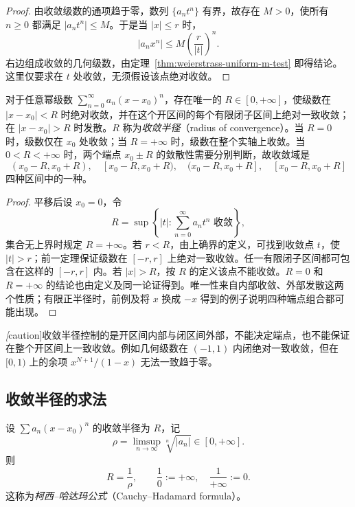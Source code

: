 \documentclass[UTF8,12pt,a4paper,fontset=fandol]{ctexbook}
\begin{document}
\begin{proof}
由收敛级数的通项趋于零，数列 $\{a_nt^n\}$ 有界，故存在 $M>0$，使所有 $n\geq0$ 都满足 $|a_nt^n|\leq M$。于是当 $|x|\leq r$ 时，
\[
    |a_nx^n|\leq M\left(\frac r{|t|}\right)^n.
\]
右边组成收敛的几何级数，由定理~\ref{thm:weierstrass-uniform-m-test} 即得结论。这里仅要求在 $t$ 处收敛，无须假设该点绝对收敛。
\end{proof}

\begin{theorem}[收敛半径与收敛域]
\label{thm:power-series-radius-and-domain}
对于任意幂级数 $\sum_{n=0}^\infty a_n(x-x_0)^n$，存在唯一的 $R\in[0,+\infty]$，使级数在 $|x-x_0|<R$ 时绝对收敛，并在这个开区间的每个有限闭子区间上绝对一致收敛；在 $|x-x_0|>R$ 时发散。$R$ 称为\emph{收敛半径}（radius of convergence）。当 $R=0$ 时，级数仅在 $x_0$ 处收敛；当 $R=+\infty$ 时，级数在整个实轴上收敛。当 $0<R<+\infty$ 时，两个端点 $x_0\pm R$ 的敛散性需要分别判断，故收敛域是
\[
    (x_0-R,x_0+R),\quad [x_0-R,x_0+R),\quad
    (x_0-R,x_0+R],\quad [x_0-R,x_0+R]
\]
四种区间中的一种。
\end{theorem}

\begin{proof}
平移后设 $x_0=0$，令
\[
    R=\sup\left\{|t|:\sum_{n=0}^\infty a_nt^n\text{ 收敛}\right\},
\]
集合无上界时规定 $R=+\infty$。若 $r<R$，由上确界的定义，可找到收敛点 $t$，使 $|t|>r$；前一定理保证级数在 $[-r,r]$ 上绝对一致收敛。任一有限闭子区间都可包含在这样的 $[-r,r]$ 内。若 $|x|>R$，按 $R$ 的定义该点不能收敛。$R=0$ 和 $R=+\infty$ 的结论也由定义及同一论证得到。唯一性来自内部收敛、外部发散这两个性质；有限正半径时，前例及将 $x$ 换成 $-x$ 得到的例子说明四种端点组合都可能出现。
\end{proof}

\emph[caution]{收敛半径控制的是开区间内部与闭区间外部，不能决定端点，也不能保证在整个开区间上一致收敛。}例如几何级数在 $(-1,1)$ 内闭绝对一致收敛，但在 $[0,1)$ 上的余项 $x^{N+1}/(1-x)$ 无法一致趋于零。

\subsection{收敛半径的求法}
\label{subsec:computing-the-radius-of-convergence}

\begin{theorem}[柯西--哈达玛定理]
\label{thm:cauchy-hadamard-radius}
设 $\sum a_n(x-x_0)^n$ 的收敛半径为 $R$，记
\[
    \rho=\limsup_{n\to\infty}\sqrt[n]{|a_n|}\in[0,+\infty].
\]
则
\begin{equation}
    R=\frac1\rho,
    \qquad \frac10:=+\infty,\quad \frac1{+\infty}:=0.
    \label{eq:cauchy-hadamard-radius}
\end{equation}
这称为\emph{柯西--哈达玛公式}（Cauchy--Hadamard formula）。
\end{theorem}
\end{document}
